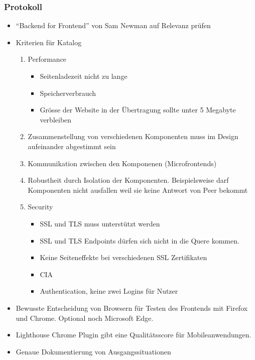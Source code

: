 \documentclass{article}
\begin{document}
\subsubsection{Protokoll}
\begin{itemize}
    \item ``Backend for Frontend'' von Sam Newman auf Relevanz prüfen
    \item Kriterien für Katalog
        \begin{enumerate}
            \item Performance
            \begin{itemize}
                \item Seitenladezeit nicht zu lange
                \item Speicherverbrauch
                \item Grösse der Website in der Übertragung sollte unter 5 Megabyte verbleiben
            \end{itemize}
            \item Zusammenstellung von verschiedenen Komponenten muss im Design aufeinander abgestimmt sein
            \item  Kommunikation zwischen den Komponenen (Microfrontends)
            \item  Robustheit durch Isolation der Komponenten. Beispielsweise darf Komponenten nicht ausfallen weil sie keine Antwort von Peer bekommt
            \item Security
                \begin{itemize}
                    \item SSL und TLS muss unterstützt werden
                    \item SSL und TLS Endpoints dürfen sich nicht in die Quere kommen.
                    \item Keine Seiteneffekte bei verschiedenen SSL Zertifikaten
                    \item CIA
                    \item Authentication, keine zwei Logins für Nutzer
                \end{itemize}
        \end{enumerate}
    \item Bewusste Entscheidung von Browsern für Testen des Frontends mit Firefox und Chrome. Optional noch Microsoft Edge. 
    \item Lighthouse Chrome Plugin gibt eine Qualitätsscore für Mobileanwendungen.
    \item Genaue Dokumentierung von Ausgangssituationen

\end{itemize}
\end{document}

